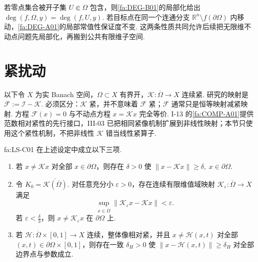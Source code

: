 \begin{FARemark}[切除性与目标点局部常值性]
若零点集合被开子集 \(\displaystyle U\Subset\Omega\) 包含，则\autoref{fa:DEG-B01}的局部化给出 \(\displaystyle\deg(f,\Omega,y)=\deg(f,U,y)\). 若目标点在同一个连通分支 \(\displaystyle\mathbb R^n\setminus f(\partial\Omega)\) 内移动，\autoref{fa:DEG-A01}的局部常值性保证度不变. 这两条性质共同允许后续把无限维不动点问题先局部化，再搬到公共有限维子空间.
\end{FARemark}

\section{紧扰动}\label{sec:iii04-compact-perturbations}

以下令 \(\displaystyle X\) 为实 Banach 空间，\(\displaystyle\Omega\subset X\) 有界开，\(\displaystyle\mathcal K:\overline\Omega\to X\) 连续紧. 研究的映射是
\(\displaystyle \mathcal F := \mathcal I-\mathcal K.\)
必须区分：\(\displaystyle\mathcal K\) 紧，并不意味着 \(\displaystyle\mathcal F\) 紧；\(\displaystyle\mathcal F\) 通常只是恒等映射减紧映射. 方程 \(\displaystyle\mathcal F(x)=0\) 与不动点方程 \(\displaystyle x=\mathcal Kx\) 完全等价. I-13 的\autoref{fa:COMP-A01}提供范数相对紧性的先行接口，III-03 已把相同紧像机制扩展到非线性映射；本节只使用这个紧性机制，不把非线性 \(\displaystyle\mathcal K\) 错当线性紧算子.

\begin{FAProposition}[C][紧扰动恒等映射的边界间隙与有限维逼近工具]{fa:LS-C01}
在上述设定中成立以下三项.

\begin{enumerate}
\item 若 \(\displaystyle x\neq\mathcal Kx\) 对全部 \(\displaystyle x\in\partial\Omega\)，则存在 \(\displaystyle\delta>0\) 使
\(\displaystyle \|x-\mathcal Kx\|\geqslant\delta, \; x\in\partial\Omega.\)
\item 令 \(\displaystyle K_0=\overline{\mathcal K(\overline\Omega)}\). 对任意充分小 \(\displaystyle\varepsilon>0\)，存在连续有限维值域映射 \(\displaystyle\mathcal K_{\varepsilon}:\overline\Omega\to X\) 满足
\[
\sup_{x\in\overline\Omega}
\|\mathcal K_{\varepsilon}x-\mathcal Kx\|<\varepsilon.
\]
若 \(\displaystyle\varepsilon<\frac{\delta}{3}\)，则 \(\displaystyle x\neq\mathcal K_{\varepsilon}x\) 在 \(\displaystyle\partial\Omega\) 上.
\item 若 \(\displaystyle\mathcal H:\overline\Omega\times[0,1]\to X\) 连续，整体像相对紧，并且 \(\displaystyle x\neq\mathcal H(x,t)\) 对全部 \(\displaystyle(x,t)\in\partial\Omega\times[0,1]\)，则存在一致 \(\displaystyle\delta_H>0\) 使
\(\displaystyle \|x-\mathcal H(x,t)\|\geqslant\delta_H\)
对全部边界点与参数成立.
\end{enumerate}
\end{FAProposition}

